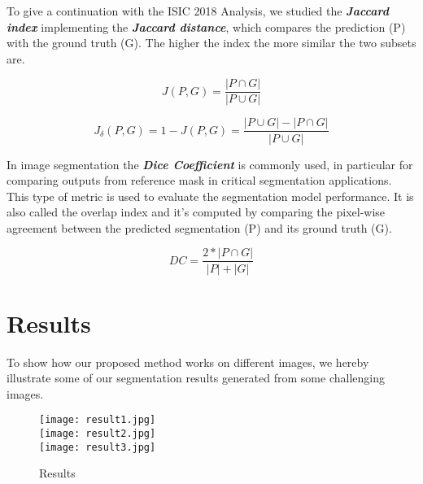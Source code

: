 \documentclass[12pt,a4paper,oneside]{report} %
\begin{document}
To give a continuation with the ISIC 2018 Analysis, we studied the \textbf{\textit {Jaccard index}} implementing the \textbf{\textit {Jaccard distance}}, which compares the prediction (P) with the ground truth (G). The higher the index the more similar the two subsets are.
\begin{center}
\begin{equation}
J(P,G)=\frac{ |P  \cap G | }{|P\cup G|} 
\label{eq:jac}
\end{equation}
\end{center}

\begin{center}
\begin{equation}
J_\delta(P,G)=1-J(P,G)=\frac{ {|P\cup G|} - |P  \cap G | }{|P \cup G|} 
\label{eq:jac}
\end{equation}
\end{center}

In image segmentation the \textbf{\textit {Dice Coefficient}} is commonly used, in particular for comparing outputs from reference mask in critical segmentation applications.  This type of metric is used to evaluate the segmentation model performance.
It is also called the overlap index and it's computed by comparing the pixel-wise agreement between the predicted segmentation (P) and its ground truth (G).
\begin{center}
\begin{equation}
DC=\frac{2*| P  \cap G | }{|P| + |G|} 
\label{eq:dice}
\end{equation}
\end{center}

\chapter*{Results}
\setcounter{secnumdepth}{0}

To show how our proposed method works on different images, we hereby illustrate some of our segmentation results generated from some challenging images.

\begin{figure}[h!]
\begin{center}
   \texttt{[image: result1.jpg]}\\
   \texttt{[image: result2.jpg]}\\
   \texttt{[image: result3.jpg]}\\
\caption{Results}
\label{fig:results}
\end{center}
\end{figure}
\end{document}
